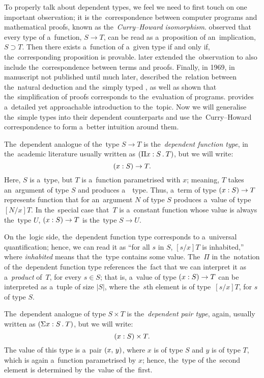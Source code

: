 To properly talk about dependent types, we feel we need to first touch on one
important observation; it is the~correspondence between computer programs and
mathematical proofs, known as the~\emph{Curry–Howard isomorphism}.
\citet{curry_1934} observed that every type of a~function, $S \to T$,
can be read as a~proposition of an~implication, $S \supset T$. Then there exists
a~function of a~given type if and only if, the~corresponding proposition is
provable. \citet{curry_1958} later extended the~observation to also include
the~correspondence between terms and proofs. Finally, in 1969, in manuscript not
published until much later, \citet{howard_1980} described the~relation between
the~natural deduction and the~simply typed \lc, as well as shown that
the~simplification of proofs corresponds to the~evaluation of programs.
\citet{wadler_2015} provides a~detailed yet approachable introduction to
the~topic. Now we will generalise the~simple types into their dependent
counterparts and use the~Curry–Howard correspondence to form a~better intuition
around them.

The~dependent analogue of the~type $S \to T$ is the~\emph{dependent
function type}, in the~academic literature usually written as ${(\Pi x \overset{}:
S \, . \: T)}$, but we will write:
\[
  (x : S) \to T.
\]
Here, $S$ is a~type, but $T$ is a~function parametrised with $x$; meaning, $T$
takes an~argument of type $S$ and produces a~~type. Thus, a~term of type
$(x : S) \to T$ represents function that for an~argument $N$ of type $S$ produces
a~value of type \,$[N/x]T$. In the~special case that \,$T$ is a~constant
function whose value is always the~type $U$, $(x : S) \to T$ is the~type $S \to U$.

On the~logic side, the~dependent function type corresponds to a~universal
quantification; hence, we can read it as ``for all $s$ in $S$, $[s/x]T$ is
inhabited,'' where \emph{inhabited} means that the~type contains some value.
The~$\Pi$ in the~notation of the~dependent function type references the~fact
that we can interpret it as a~\emph{product} of \,$T$, for every $s \in S$; that
is, a~value of type $(x : S) \to T$ can be interpreted as a~tuple of size $|S|$,
where the~$s$th element is of type \,$[s/x]T$, for $s$ of type $S$.

The~dependent analogue of type $S \times T$ is the~\emph{dependent pair type},
again, usually written as ${(\Sigma x \overset{}: S \, . \: T)}$, but we will write:
\[
  (x \overset{}: S) \times T.
\]
The value of this type is a~pair $(x, \, y)$, where $x$ is of type $S$ and $y$
is of type $T$, which is again a~function parametrised by $x$; hence, the~type
of the~second element is determined by the~value of the~first.

